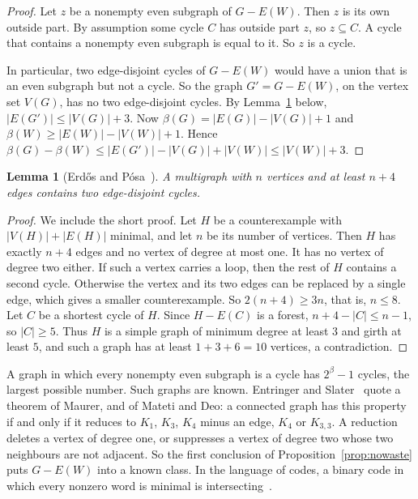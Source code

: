 \documentclass[11pt]{article}
\newtheorem{lemma}[theorem]{Lemma}
\theoremstyle{definition}
\theoremstyle{remark}
\numberwithin{equation}{section}
\begin{document}
\begin{proof}
Let $z$ be a nonempty even subgraph of $G-E(W)$. Then $z$ is its own outside part. By assumption
some cycle $C$ has outside part $z$, so $z\subseteq C$. A cycle that contains a nonempty even
subgraph is equal to it. So $z$ is a cycle.

In particular, two edge-disjoint cycles of $G-E(W)$ would have a union that is an even subgraph but
not a cycle. So the graph $G'=G-E(W)$, on the vertex set $V(G)$, has no two edge-disjoint cycles.
By Lemma~\ref{lem:EP} below, $|E(G')|\le|V(G)|+3$. Now $\beta(G)=|E(G)|-|V(G)|+1$ and
$\beta(W)\ge|E(W)|-|V(W)|+1$. Hence
$\beta(G)-\beta(W)\le|E(G')|-|V(G)|+|V(W)|\le|V(W)|+3$.
\end{proof}

\begin{lemma}[Erd\H{o}s and P\'osa~\cite{EP}]\label{lem:EP}
A multigraph with $n$ vertices and at least $n+4$ edges contains two edge-disjoint cycles.
\end{lemma}

\begin{proof}
We include the short proof. Let $H$ be a counterexample with $|V(H)|+|E(H)|$ minimal, and let $n$
be its number of vertices. Then $H$ has exactly $n+4$ edges and no vertex of degree at most one. It
has no vertex of degree two either. If such a vertex carries a loop, then the rest of $H$ contains a
second cycle. Otherwise the vertex and its two edges can be replaced by a single edge, which gives a
smaller counterexample. So
$2(n+4)\ge3n$, that is, $n\le8$. Let $C$ be a shortest cycle of $H$. Since $H-E(C)$ is a forest,
$n+4-|C|\le n-1$, so $|C|\ge5$. Thus $H$ is a simple graph of minimum degree at least $3$ and girth
at least $5$, and such a graph has at least $1+3+6=10$ vertices, a contradiction.
\end{proof}

A graph in which every nonempty even subgraph is a cycle has $2^{\beta}-1$ cycles, the largest
possible number. Such graphs are known. Entringer and Slater~\cite[Theorem~1]{ES} quote a theorem of
Maurer, and of Mateti and Deo: a connected graph has this property if and only if it reduces to
$K_1$, $K_3$, $K_4$ minus an edge, $K_4$ or $K_{3,3}$. A reduction deletes a vertex of degree one,
or suppresses a vertex of degree two whose two neighbours are not adjacent. So the first conclusion of Proposition~\ref{prop:nowaste}
puts $G-E(W)$ into a known class. In the language of codes, a binary code in which every nonzero
word is minimal is intersecting~\cite[\S2]{AACST}.
\end{document}
